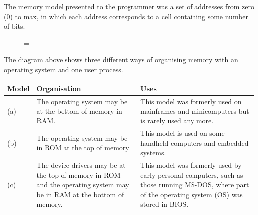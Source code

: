\documentclass[a4paper]{systems-software}
\begin{document}
The memory model presented to the programmer was a set of addresses from zero (0) to max, in which each address corresponds to a cell containing some number of bits.

\begin{figure}[H]
  \lineskip=-\fboxrule
\end{figure}

The diagram above shows three different ways of organising memory with an operating system and one user process.

\begin{longtabu} to \textwidth {| X[1,l] | X[6,l] | X[6,l] | }
    \hline
    \textbf{Model} & \textbf{Organisation} & \textbf{Uses} 
	\\ \hline
	(a) & The operating system may be at the bottom of memory in RAM.
	& This model was formerly used on mainframes and minicomputers but is rarely used any more.
	\\ \hline
	(b) & The operating system may be in ROM at the top of memory.
	& This model is used on some handheld computers and embedded systems. 
	\\ \hline
	(c) & The device drivers may be at the top of memory in ROM and the operating system may be in RAM at the bottom of memory.
	& This model was formerly used by early personal computers, such as those running MS-DOS, where part of the operating system (OS) was stored in BIOS.
	\\ \hline
\end{longtabu}
\end{document}
